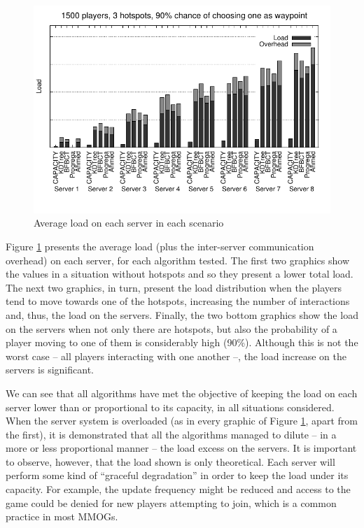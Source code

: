 \documentclass[acmjacm]{acmtrans2m}
\newcommand{\figurecaption}{Figure}
\begin{document}
\begin{figure}[!t]
	\includegraphics[width=0.495\linewidth]{data/1500players_prob90/distribution_1500_90}

	\caption{Average load on each server in each scenario}
	\label{fig:distribution}
\end{figure}

\figurecaption{} \ref{fig:distribution} presents the average load (plus the inter-server communication overhead) on each server, for each algorithm tested. The first two graphics show the values in a situation without hotspots and so they present a lower total load. The next two graphics, in turn, present the load distribution when the players tend to move towards one of the hotspots, increasing the number of interactions and, thus, the load on the servers. Finally, the two bottom graphics show the load on the servers when not only there are hotspots, but also the probability of a player moving to one of them is considerably high (90\%). Although this is not the worst case -- all players interacting with one another --, the load increase on the servers is significant.

We can see that all algorithms have met the objective of keeping the load on each server lower than or proportional to its capacity, in all situations considered. When the server system is overloaded (as in every graphic of \figurecaption{} \ref{fig:distribution}, apart from the first), it is demonstrated that all the algorithms managed to dilute -- in a more or less proportional manner -- the load excess on the servers. It is important to observe, however, that the load shown is only theoretical. Each server will perform some kind of ``graceful degradation'' in order to keep the load under its capacity. For example, the update frequency might be reduced and access to the game could be denied for new players attempting to join, which is a common practice in most MMOGs.
\end{document}
